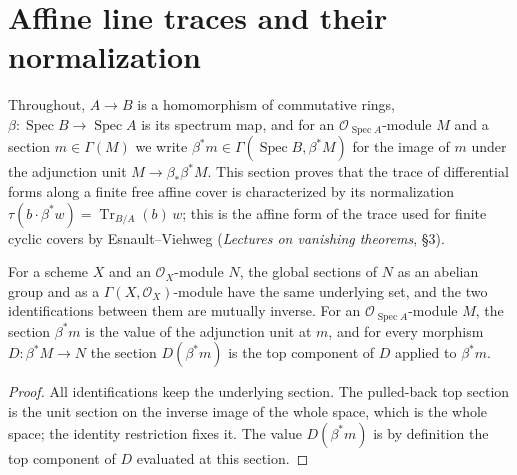 \section{Affine line traces and their normalization}
\label{sec:kn-affine-line-normalization}

Throughout, $A\to B$ is a homomorphism of commutative rings,
$\beta:\operatorname{Spec}B\to\operatorname{Spec}A$ is its spectrum map, and for an
$\mathcal O_{\operatorname{Spec}A}$-module $M$ and a section $m\in\Gamma(M)$ we write
$\beta^*m\in\Gamma(\operatorname{Spec}B,\beta^*M)$ for the image of $m$ under the
adjunction unit $M\to\beta_*\beta^*M$. This section proves that the trace of differential
forms along a finite free affine cover is characterized by its normalization
$\tau(b\cdot\beta^*w)=\operatorname{Tr}_{B/A}(b)\,w$; this is the affine form of the
trace used for finite cyclic covers by Esnault--Viehweg (\emph{Lectures on vanishing theorems}, \S3).

\begin{lemma}
\label{lem:kn-affine-line-section-presentation}
\leanok
For a scheme $X$ and an $\mathcal O_X$-module $N$, the global sections of $N$ as an abelian
group and as a $\Gamma(X,\mathcal O_X)$-module have the same underlying set, and the two
identifications between them are mutually inverse. For an
$\mathcal O_{\operatorname{Spec}A}$-module $M$, the section $\beta^*m$ is the value of the
adjunction unit at $m$, and for every morphism $D:\beta^*M\to N$ the section
$D(\beta^*m)$ is the top component of $D$ applied to $\beta^*m$.
\end{lemma}
\begin{proof}
All identifications keep the underlying section. The pulled-back top section is the unit
section on the inverse image of the whole space, which is the whole space; the identity
restriction fixes it. The value $D(\beta^*m)$ is by definition the top component of $D$
evaluated at this section.
\end{proof}

